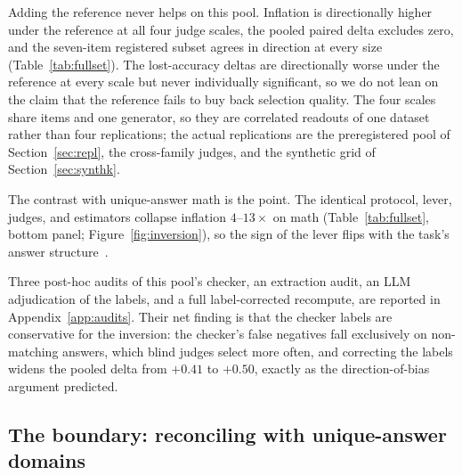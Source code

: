 \documentclass[11pt]{article}
\begin{document}
Adding the reference never helps on this pool.
Inflation is directionally higher under the reference at all four judge scales, the pooled paired delta excludes zero, and the seven-item registered subset agrees in direction at every size (Table~\ref{tab:fullset}).
The lost-accuracy deltas are directionally worse under the reference at every scale but never individually significant, so we do not lean on the claim that the reference fails to buy back selection quality.
The four scales share items and one generator, so they are correlated readouts of one dataset rather than four replications; the actual replications are the preregistered pool of Section~\ref{sec:repl}, the cross-family judges, and the synthetic grid of Section~\ref{sec:synthk}.

The contrast with unique-answer math is the point.
The identical protocol, lever, judges, and estimators collapse inflation $4$--$13\times$ on math (Table~\ref{tab:fullset}, bottom panel; Figure~\ref{fig:inversion}), so the sign of the lever flips with the task's answer structure~\cite{companionA}.

Three post-hoc audits of this pool's checker, an extraction audit, an LLM adjudication of the labels, and a full label-corrected recompute, are reported in Appendix~\ref{app:audits}.
Their net finding is that the checker labels are conservative for the inversion: the checker's false negatives fall exclusively on non-matching answers, which blind judges select more often, and correcting the labels widens the pooled delta from $+0.41$ to $+0.50$, exactly as the direction-of-bias argument predicted.

\FloatBarrier\subsection{The boundary: reconciling with unique-answer domains}
\label{sec:boundary}
\end{document}

